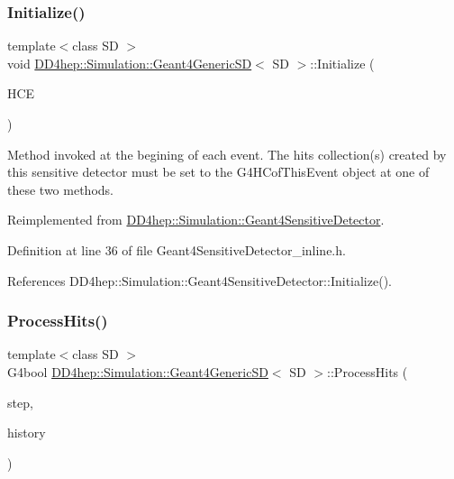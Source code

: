 \subsubsection{\texorpdfstring{Initialize()}{Initialize()}}
{\footnotesize\ttfamily template$<$class SD $>$ \\
void \hyperlink{class_d_d4hep_1_1_simulation_1_1_geant4_generic_s_d}{D\+D4hep\+::\+Simulation\+::\+Geant4\+Generic\+SD}$<$ SD $>$\+::Initialize (\begin{DoxyParamCaption}\item[{G4\+H\+Cof\+This\+Event $\ast$}]{H\+CE }\end{DoxyParamCaption})\hspace{0.3cm}{\ttfamily [virtual]}}

Method invoked at the begining of each event. The hits collection(s) created by this sensitive detector must be set to the G4\+H\+Cof\+This\+Event object at one of these two methods. 

Reimplemented from \hyperlink{class_d_d4hep_1_1_simulation_1_1_geant4_sensitive_detector_a7ee158e29937473f04db1cc6c7284923}{D\+D4hep\+::\+Simulation\+::\+Geant4\+Sensitive\+Detector}.



Definition at line 36 of file Geant4\+Sensitive\+Detector\+\_\+inline.\+h.



References D\+D4hep\+::\+Simulation\+::\+Geant4\+Sensitive\+Detector\+::\+Initialize().

\hypertarget{class_d_d4hep_1_1_simulation_1_1_geant4_generic_s_d_aecea47598186c697197f51c683f13bbb}{}\label{class_d_d4hep_1_1_simulation_1_1_geant4_generic_s_d_aecea47598186c697197f51c683f13bbb} 
\subsubsection{\texorpdfstring{Process\+Hits()}{ProcessHits()}}
{\footnotesize\ttfamily template$<$class SD $>$ \\
G4bool \hyperlink{class_d_d4hep_1_1_simulation_1_1_geant4_generic_s_d}{D\+D4hep\+::\+Simulation\+::\+Geant4\+Generic\+SD}$<$ SD $>$\+::Process\+Hits (\begin{DoxyParamCaption}\item[{G4\+Step $\ast$}]{step,  }\item[{G4\+Touchable\+History $\ast$}]{history }\end{DoxyParamCaption})\hspace{0.3cm}{\ttfamily [virtual]}}



